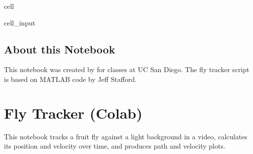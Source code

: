 \documentclass[letterpaper,10pt,english]{jupyterBook}
\begin{document}
\begin{sphinxuseclass}{cell}
\begin{sphinxVerbatimInput}
\begin{sphinxuseclass}{cell_input}
\begin{sphinxVerbatim}[commandchars=\\\{\}]
 
 
 

\end{sphinxVerbatim}

\end{sphinxuseclass}\end{sphinxVerbatimInput}

\end{sphinxuseclass}



\subsection{About this Notebook}
\label{\detokenize{FlyTracking/Script:about-this-notebook}}
\sphinxAtStartPar
This notebook was created by  for classes at UC San Diego. The fly tracker script is based on MATLAB code by Jeff Stafford.

\sphinxstepscope


\section{Fly Tracker (Colab)}
\label{\detokenize{FlyTracking/ColabNotebook:fly-tracker-colab}}\label{\detokenize{FlyTracking/ColabNotebook::doc}}
\sphinxAtStartPar
This notebook tracks a fruit fly against a light background in a video, calculates its position and velocity over time, and produces path and velocity plots.
\end{document}
